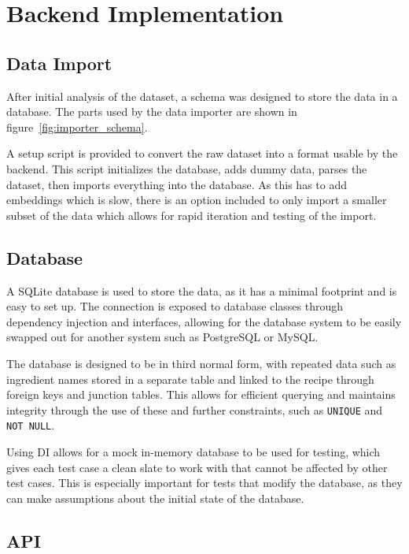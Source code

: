 \section{Backend Implementation}

\subsection{Data Import}

After initial analysis of the dataset, a schema was designed to store the data in a database. The parts used by the
data importer are shown in figure~\ref{fig:importer_schema}.

A setup script is provided to convert the raw dataset into a format usable by the backend.
This script initializes the database, adds dummy data, parses the dataset, then imports everything
into the database. As this has to add embeddings which is slow, there is an option included
to only import a smaller subset of the data which allows for rapid iteration and testing of the import.

\subsection{Database}

A SQLite database is used to store the data, as it has a minimal footprint and is easy to set up. The connection
is exposed to database classes through dependency injection and interfaces, allowing for the database system to be
easily swapped out for another system such as PostgreSQL or MySQL.

The database is designed to be in third normal form, with repeated data such as ingredient names stored in a separate
table and linked to the recipe through foreign keys and junction tables. This allows for efficient querying and
maintains integrity through the use of these and further constraints, such as \texttt{UNIQUE} and \texttt{NOT NULL}.~\cite{codd_further_1972}

Using DI allows for a mock in-memory database to be used for testing, which gives each test case a clean slate to work with
that cannot be affected by other test cases. This is especially important for tests that modify the database, as they can
make assumptions about the initial state of the database.

\subsection{API}

